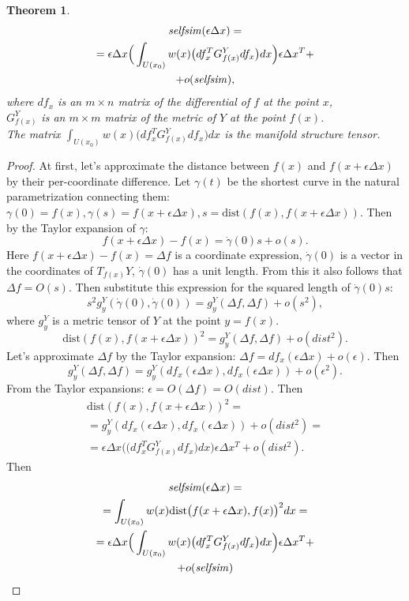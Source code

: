 \documentclass[a4paper,twoside]{article}
\newtheorem{theorem}{Theorem}
\newcommand{\selfsim}{\mathop{\it selfsim}}
\newcommand{\dist}{\mathrm{dist}}
\newcommand{\delx}{\Delta x}
\begin{document}
\begin{theorem}\label{ManifoldCase}
\begin{multline*}\selfsim(\epsilon\delx) = \\
=\epsilon\delx\Big(\int_{U(x_0)} w(x) \big(df_x^T G^Y_{f(x)} df_x\big) dx\Big) \epsilon\delx^T +\\
+ o(\selfsim),\end{multline*}
where $df_x$ is an $m \times n$ matrix of the differential of $f$ at the point $x$,
\\
$G^Y_{f(x)}$ is an $m \times m$ matrix of the metric of $Y$ at the point $f(x)$.
\\
The matrix $\int_{U(x_0)} w(x) \big(df_x^T G^Y_{f(x)} df_x\big) dx$ is the manifold structure tensor.
\end{theorem}
\begin{proof}
At first, let's approximate the distance between $f(x)$ and $f(x + \epsilon\delx)$ by their per-coordinate difference. Let $\gamma(t)$ be the shortest curve  in the natural parametrization connecting them: $\gamma(0) = f(x), \gamma(s) = f(x + \epsilon\delx), s=\dist(f(x), f(x + \epsilon\delx))$. Then by the Taylor expansion of $\gamma$:
$$f(x + \epsilon\delx) - f(x) = \dot{\gamma}(0) s + o(s).$$
Here $f(x + \epsilon\delx) - f(x) = \Delta f$ is a coordinate expression, $\dot{\gamma}(0)$ is a vector in the coordinates of $T_{f(x)}Y$,  $\dot{\gamma}(0)$ has a unit length. From this it also follows that $\Delta f = O(s)$. Then substitute this expression for the squared length of $\dot{\gamma}(0) s$:
$$s^2 g_y^Y (\dot{\gamma}(0), \dot{\gamma}(0)) = g_y^Y(\Delta f, \Delta f) + o(s^2), $$
where $g_y^Y$ is a metric tensor of $Y$ at the point $y=f(x)$.
$$\dist(f(x), f(x + \epsilon\delx))^2 = g_y^Y(\Delta f, \Delta f) + o(dist^2). $$
Let's approximate $\Delta f$ by the Taylor expansion: $\Delta f = df_x(\epsilon\delx) + o(\epsilon).$ Then
$$g_y^Y(\Delta f, \Delta f) = g_y^Y(df_x(\epsilon\delx), df_x(\epsilon\delx)) + o(\epsilon^2).$$
From the Taylor expansions: $\epsilon = O(\Delta f) = O(dist)$. Then 
\begin{multline*} \dist(f(x), f(x + \epsilon\delx))^2 = \\
= g_y^Y(df_x(\epsilon\delx), df_x(\epsilon\delx)) + o(dist^2) = \\
= \epsilon\delx\Big(\big(df_x^T G^Y_{f(x)} df_x\big) dx\Big) \epsilon\delx^T + o(dist^2).
\end{multline*}
Then 
\begin{multline*} 
\selfsim(\epsilon\delx) = \\
= \int_{U(x_0)} w(x) \dist\big(f(x+\epsilon\delx), f(x)\big)^2 dx = \\
=\epsilon\delx\Big(\int_{U(x_0)} w(x) \big(df_x^T G^Y_{f(x)} df_x\big) dx\Big) \epsilon\delx^T + \\
+ o(\selfsim)
\end{multline*}
\end{proof}
\end{document}
